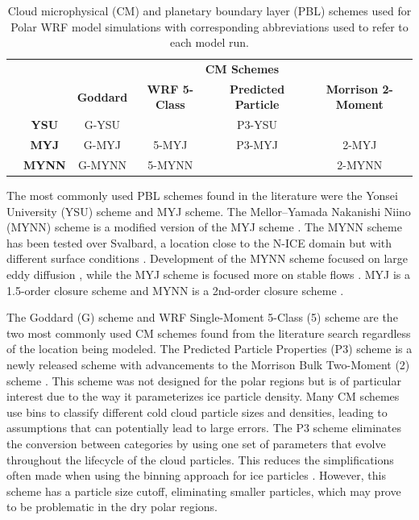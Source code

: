 \begin{table}[t]
\doublespacing
\centering
\footnotesize
{\begin{tabular}{| c | c | c | c | c | c |}
  \hline
 \rowcolor[HTML]{F3F3F3} & & \multicolumn{4}{c|}{\textbf{CM Schemes}} \\
 \rowcolor[HTML]{F3F3F3} & & \textbf{Goddard} & \textbf{WRF 5-Class} & \textbf{Predicted Particle} & \textbf{Morrison 2-Moment} \\
  \hline
\cellcolor[HTML]{F3F3F3}
 &\textbf{YSU} & G-YSU & & P3-YSU & \\
\cellcolor[HTML]{F3F3F3}  & \textbf{MYJ} & G-MYJ & 5-MYJ & P3-MYJ & 2-MYJ \\ 
\cellcolor[HTML]{F3F3F3}  \parbox[t]{3mm}{} \parbox[t]{2mm}{} & \textbf{MYNN} & G-MYNN & 5-MYNN & & 2-MYNN \\
  \hline
\end{tabular}}
\caption[Cloud microphysics and planetary boundary layer schemes used in polar WRF simulations.]{Cloud microphysical (CM) and planetary boundary layer (PBL) schemes used for Polar WRF model simulations with corresponding abbreviations used to refer to each model run.}
\label{tab:schemes}
\end{table}

The most commonly used PBL schemes found in the literature were the Yonsei University (YSU) scheme \citep{hong:2004} and MYJ scheme. The Mellor–Yamada Nakanishi Niino (MYNN) scheme \citep{olson:2019} is a modified version of the MYJ scheme \citep{mesinger:1993}. The MYNN scheme has been tested over Svalbard, a location close to the N-ICE domain but with different surface conditions \citep{pilguj:2018}. Development of the MYNN scheme focused on large eddy diffusion \citep{cohen:2015}, while the MYJ scheme is focused more on stable flows \citep{janjic:1994, mellor:1982}. MYJ is a 1.5-order closure scheme and MYNN is a 2nd-order closure scheme \citep{pilguj:2018}.

The Goddard (G) scheme \citep{tao:2000} and WRF Single-Moment 5-Class (5) scheme \citep{hong:2004} are the two most commonly used CM schemes found from the literature search regardless of the location being modeled. The Predicted Particle Properties (P3) scheme is a newly released scheme with advancements to the Morrison Bulk Two-Moment (2) scheme \citep{milbrandt:2016, morrison:2015}. This scheme was not designed for the polar regions but is of particular interest due to the way it parameterizes ice particle density. Many CM schemes use bins to classify different cold cloud particle sizes and densities, leading to assumptions that can potentially lead to large errors. The P3 scheme eliminates the conversion between categories by using one set of parameters that evolve throughout the lifecycle of the cloud particles. This reduces the simplifications often made when using the binning approach for ice particles \citep{morrison:2005}. However, this scheme has a particle size cutoff, eliminating smaller particles, which may prove to be problematic in the dry polar regions.

